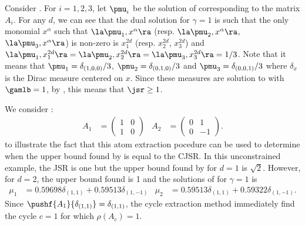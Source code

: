 \documentclass[11pt,twoside,a4paper,openright]{uclouvain-thesis}
\begin{document}
\begin{myexem}
  \label{exem:simple2}
  Consider .
  For $i = 1, 2, 3$, let $\pmu_i$ be the solution of  corresponding to the matrix $A_i$.
  For any $d$, we can see that the dual solution for $\gamma = 1$ is such that
  the only monomial $x^\alpha$ such that $\la\pmu_1, x^\alpha \ra$ (resp. $\la \pmu_2, x^\alpha \ra$, $\la \pmu_3, x^\alpha \ra$) is non-zero is $x_1^{2d}$ (resp. $x_2^{2d}$, $x_3^{2d}$)
  and $\la \pmu_1, x_1^{2d} \ra = \la \pmu_2, x_2^{2d} \ra = \la \pmu_3, x_3^{2d} \ra = 1/3$.
  Note that it means that $\pmu_1 = \delta_{(1,0,0)}/3$, $\pmu_2 = \delta_{(0,1,0)}/3$ and $\pmu_3 = \delta_{(0,0,1)}/3$
  where $\delta_x$ is the Dirac measure centered on $x$.
  Since these measures are solution to  with $\gamlb = 1$,
  by , this means that $\jsr \geq 1$.
\end{myexem}

\begin{myexem}
  \label{exem:ando}
  We consider \cite[Example~2.8]{parrilo2008approximation}:
  \begin{align*}
    A_1 & =
    \begin{pmatrix}
      1 & 0\\
      1 & 0
    \end{pmatrix} &
    A_2 & =
    \begin{pmatrix}
      0 & 1\\
      0 & -1
    \end{pmatrix}.
  \end{align*}
  to illustrate the fact that this atom extraction pocedure can be used to determine
  when the upper bound found by  is equal to the CJSR.
  In this unconstrained example, the JSR is one but the upper bound found by  for $d=1$ is $\sqrt{2}$.
  However, for $d=2$, the upper bound found is 1 and the solutions of  for $\gamma=1$ is
  \begin{align*}
    \mu_1 & = 0.59698 \delta_{(1, 1)} + 0.59513 \delta_{(1, -1)} &
    \mu_2 & = 0.59513 \delta_{(1, 1)} + 0.59322 \delta_{(1, -1)}.
  \end{align*}
  Since $\pushf{A_1}{\delta_{(1, 1)}} = \delta_{(1, 1)}$, the cycle extraction method immediately find the cycle $c = 1$ for which $\rho(A_c) = 1$.
\end{myexem}
\end{document}
